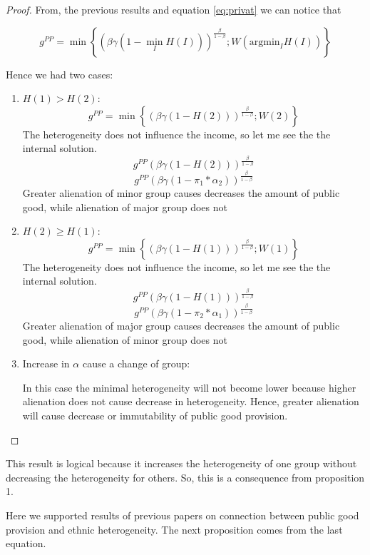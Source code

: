 \documentclass[letterpaper,11pt]{article}
\begin{document}
\begin{proof}
From, the previous results and equation \ref{eq:privat} we can notice that

\[ g^{PP} = \min \left\{ (\beta\gamma  ( 1 - \min_{I} H(I)))^\frac{\beta}{1 -\beta}; W( \text{argmin}_{I} H(I)) \right\} \]

Hence we had two cases:
\begin{enumerate}
    \item $H(1) > H(2)$:
    \[ g^{PP} = \min \left\{ (\beta\gamma  ( 1 - H(2)))^\frac{\beta}{1 -\beta}; W(2) \right\} \]
    The heterogeneity does not influence the income, so let me see the the internal solution.
    \[ g^{PP} (\beta\gamma  ( 1 - H(2)))^\frac{\beta}{1 -\beta} \]
    \[ g^{PP} (\beta\gamma  ( 1 - \pi_1 * \alpha_2))^\frac{\beta}{1 -\beta} \]
    Greater alienation of minor group causes decreases the amount of public good, while alienation of major group does not
    
    \item $H(2) \ge H(1)$:
    \[ g^{PP} = \min \left\{ (\beta\gamma  ( 1 - H(1)))^\frac{\beta}{1 -\beta}; W(1) \right\} \]
    The heterogeneity does not influence the income, so let me see the the internal solution.
    \[ g^{PP} (\beta\gamma  ( 1 - H(1)))^\frac{\beta}{1 -\beta} \]
    \[ g^{PP} (\beta\gamma  ( 1 - \pi_2 * \alpha_1))^\frac{\beta}{1 -\beta} \]
    Greater alienation of major group causes decreases the amount of public good, while alienation of minor group does not
    
    \item Increase in $\alpha$ cause a change of group:
    
    In this case the minimal heterogeneity will not become lower because higher alienation does not cause decrease in heterogeneity. Hence, greater alienation will cause decrease or immutability of public good provision.
    
\end{enumerate}

\end{proof}

This result is logical because it increases the heterogeneity of one group without decreasing the heterogeneity for others. So, this is a consequence from proposition 1.


Here we supported results of previous papers on connection between public good provision and ethnic heterogeneity. The next proposition comes from the last equation. 
\end{document}
